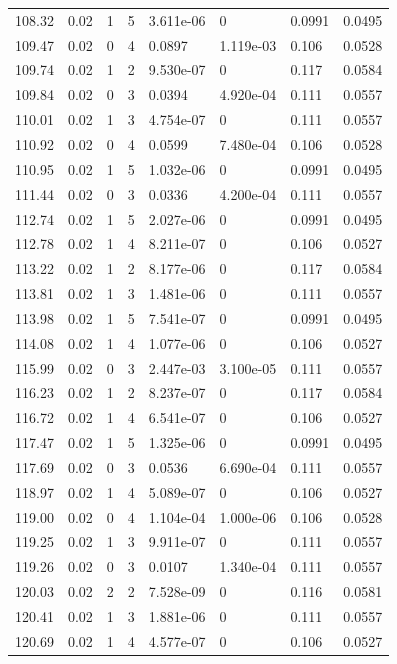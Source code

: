 \documentclass[preview]{standalone}
\begin{document}
{{{\begin{tabular}{L{1.2cm}C{1.2cm} C{0.3cm}C{0.5cm} C{1.4cm}C{1.4cm} C{1.4cm}C{1.4cm}}
  108.32  &  0.02  & 1     &  5 &  3.611e-06  & 0  & 0.0991 &  0.0495   \\ 
  109.47  &  0.02  & 0     &  4 &  0.0897  & 1.119e-03  & 0.106 &  0.0528   \\ 
  109.74  &  0.02  & 1     &  2 &  9.530e-07  & 0  & 0.117 &  0.0584   \\ 
  109.84  &  0.02  & 0     &  3 &  0.0394  & 4.920e-04  & 0.111 &  0.0557   \\ 
  110.01  &  0.02  & 1     &  3 &  4.754e-07  & 0  & 0.111 &  0.0557   \\ 
  110.92  &  0.02  & 0     &  4 &  0.0599  & 7.480e-04  & 0.106 &  0.0528   \\ 
  110.95  &  0.02  & 1     &  5 &  1.032e-06  & 0  & 0.0991 &  0.0495   \\ 
  111.44  &  0.02  & 0     &  3 &  0.0336  & 4.200e-04  & 0.111 &  0.0557   \\ 
  112.74  &  0.02  & 1     &  5 &  2.027e-06  & 0  & 0.0991 &  0.0495   \\ 
  112.78  &  0.02  & 1     &  4 &  8.211e-07  & 0  & 0.106 &  0.0527   \\ 
  113.22  &  0.02  & 1     &  2 &  8.177e-06  & 0  & 0.117 &  0.0584   \\ 
  113.81  &  0.02  & 1     &  3 &  1.481e-06  & 0  & 0.111 &  0.0557   \\ 
  113.98  &  0.02  & 1     &  5 &  7.541e-07  & 0  & 0.0991 &  0.0495   \\ 
  114.08  &  0.02  & 1     &  4 &  1.077e-06  & 0  & 0.106 &  0.0527   \\ 
  115.99  &  0.02  & 0     &  3 &  2.447e-03  & 3.100e-05  & 0.111 &  0.0557   \\ 
  116.23  &  0.02  & 1     &  2 &  8.237e-07  & 0  & 0.117 &  0.0584   \\ 
  116.72  &  0.02  & 1     &  4 &  6.541e-07  & 0  & 0.106 &  0.0527   \\ 
  117.47  &  0.02  & 1     &  5 &  1.325e-06  & 0  & 0.0991 &  0.0495   \\ 
  117.69  &  0.02  & 0     &  3 &  0.0536  & 6.690e-04  & 0.111 &  0.0557   \\ 
  118.97  &  0.02  & 1     &  4 &  5.089e-07  & 0  & 0.106 &  0.0527   \\ 
  119.00  &  0.02  & 0     &  4 &  1.104e-04  & 1.000e-06  & 0.106 &  0.0528   \\ 
  119.25  &  0.02  & 1     &  3 &  9.911e-07  & 0  & 0.111 &  0.0557   \\ 
  119.26  &  0.02  & 0     &  3 &  0.0107  & 1.340e-04  & 0.111 &  0.0557   \\ 
  120.03  &  0.02  & 2     &  2 &  7.528e-09  & 0  & 0.116 &  0.0581   \\ 
  120.41  &  0.02  & 1     &  3 &  1.881e-06  & 0  & 0.111 &  0.0557   \\ 
  120.69  &  0.02  & 1     &  4 &  4.577e-07  & 0  & 0.106 &  0.0527   \\ 
\hline 
\end{tabular} 

}}}
\end{document}
